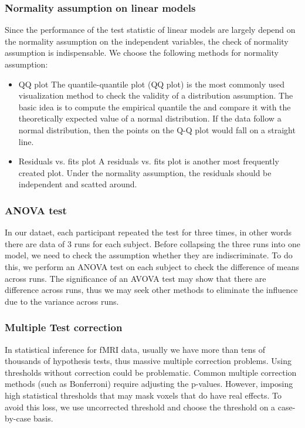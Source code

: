 \documentclass[11pt]{article}
\begin{document}
\subsubsection{Normality assumption on linear models}

Since the performance of the test statistic of linear models are largely depend on the normality assumption on the independent variables, the check of normality assumption is indispensable. We choose the following methods for normality assumption:

\begin{itemize}
\item{QQ plot} The quantile-quantile plot (QQ plot) is the most commonly used visualization method to check the validity of a distribution assumption. The basic idea is to compute the empirical quantile the and compare it with the theoretically expected value of a normal distribution. If the data follow a normal distribution, then the points on the Q-Q plot would fall on a straight line. 
\item{Residuals vs. fits plot} A residuals vs. fits plot is another most frequently created plot. Under the normality assumption, the residuals should be independent and scatted around.
\end{itemize}

\subsubsection{ANOVA test}

In our dataet, each participant repeated the test for three times, in other words there are data of 3 runs for each subject. Before collapsing the three runs into one model, we need to check the assumption whether they are indiscriminate.  To do this, we perform an ANOVA test on each subject to check the difference of means across runs. The significance of an AVOVA test may show that there are difference across runs, thus we may seek other methods to eliminate the influence due to the variance across runs.

\subsubsection{Multiple Test correction}

In statistical inference for fMRI data, usually we have more than tens of thousands of hypothesis tests, thus massive multiple correction problems. Using thresholds without correction could be problematic. Common multiple correction methods (such as Bonferroni) require adjusting the p-values. However, imposing high statistical thresholds that may mask voxels that do have real effects. To avoid this loss, we use uncorrected threshold and choose the threshold on a case-by-case basis.
\end{document}
